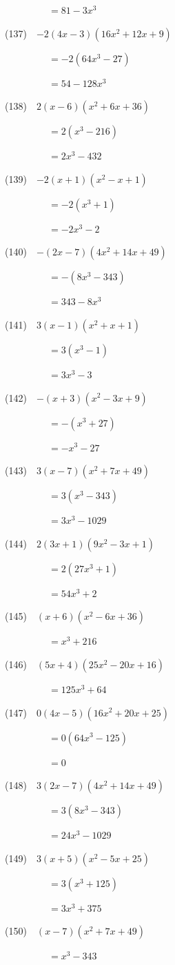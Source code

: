 \documentclass[a4j,twocolumn,10pt,fleqn]{jarticle}
\begin{document}
~~~~~~~~~$=81 - 3 x^{3}$

(137)~~$-2\left(4 x - 3\right) \left(16 x^{2} + 12 x + 9\right)$

~~~~~~~~~$=-2(64 x^{3} - 27)$

~~~~~~~~~$=54 - 128 x^{3}$

(138)~~$2\left(x - 6\right) \left(x^{2} + 6 x + 36\right)$

~~~~~~~~~$=2(x^{3} - 216)$

~~~~~~~~~$=2 x^{3} - 432$

(139)~~$-2\left(x + 1\right) \left(x^{2} - x + 1\right)$

~~~~~~~~~$=-2(x^{3} + 1)$

~~~~~~~~~$=- 2 x^{3} - 2$

(140)~~$-\left(2 x - 7\right) \left(4 x^{2} + 14 x + 49\right)$

~~~~~~~~~$=-(8 x^{3} - 343)$

~~~~~~~~~$=343 - 8 x^{3}$

(141)~~$3\left(x - 1\right) \left(x^{2} + x + 1\right)$

~~~~~~~~~$=3(x^{3} - 1)$

~~~~~~~~~$=3 x^{3} - 3$

(142)~~$-\left(x + 3\right) \left(x^{2} - 3 x + 9\right)$

~~~~~~~~~$=-(x^{3} + 27)$

~~~~~~~~~$=- x^{3} - 27$

(143)~~$3\left(x - 7\right) \left(x^{2} + 7 x + 49\right)$

~~~~~~~~~$=3(x^{3} - 343)$

~~~~~~~~~$=3 x^{3} - 1029$

(144)~~$2\left(3 x + 1\right) \left(9 x^{2} - 3 x + 1\right)$

~~~~~~~~~$=2(27 x^{3} + 1)$

~~~~~~~~~$=54 x^{3} + 2$

(145)~~$\left(x + 6\right) \left(x^{2} - 6 x + 36\right)$

~~~~~~~~~$=x^{3} + 216$

(146)~~$\left(5 x + 4\right) \left(25 x^{2} - 20 x + 16\right)$

~~~~~~~~~$=125 x^{3} + 64$

(147)~~$0\left(4 x - 5\right) \left(16 x^{2} + 20 x + 25\right)$

~~~~~~~~~$=0(64 x^{3} - 125)$

~~~~~~~~~$=0$

(148)~~$3\left(2 x - 7\right) \left(4 x^{2} + 14 x + 49\right)$

~~~~~~~~~$=3(8 x^{3} - 343)$

~~~~~~~~~$=24 x^{3} - 1029$

(149)~~$3\left(x + 5\right) \left(x^{2} - 5 x + 25\right)$

~~~~~~~~~$=3(x^{3} + 125)$

~~~~~~~~~$=3 x^{3} + 375$

(150)~~$\left(x - 7\right) \left(x^{2} + 7 x + 49\right)$

~~~~~~~~~$=x^{3} - 343$
\end{document}
